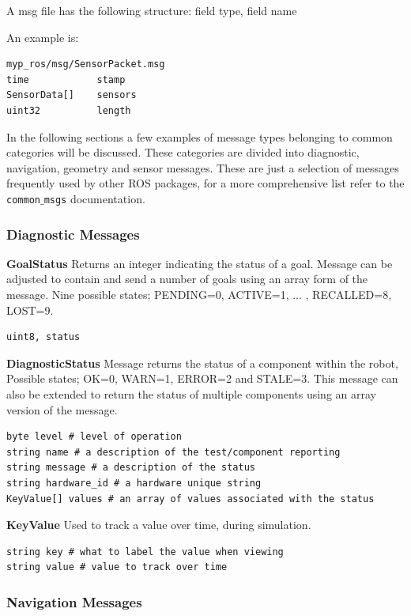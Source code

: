 \documentclass[twoside]{article}
\begin{document}
A msg file has the following structure: field type, field name

An example is:
\begin{verbatim}
myp_ros/msg/SensorPacket.msg 
time            stamp
SensorData[]    sensors
uint32          length
\end{verbatim}

In the following sections a few examples of message types belonging to common categories will be discussed. These categories are divided into diagnostic, navigation, geometry and sensor messages. These are just a selection of messages frequently used by other ROS packages, for a more comprehensive list refer to the \texttt{common$\_$msgs} documentation.


\subsubsection{Diagnostic Messages} 
\textbf{GoalStatus}\newline
Returns an integer indicating the status of a goal. Message can be adjusted to contain and send a number of goals using an array form of the message. Nine possible states; PENDING=0, ACTIVE=1, ... , RECALLED=8, LOST=9.
\begin{verbatim}
uint8, status  
\end{verbatim}

\textbf{DiagnosticStatus} \newline
Message returns the status of a component within the robot, Possible states; OK=0, WARN=1, ERROR=2 and STALE=3. This message can also be extended to return the status of multiple components using an array version of the message.
\begin{verbatim}
byte level # level of operation 
string name # a description of the test/component reporting
string message # a description of the status
string hardware_id # a hardware unique string
KeyValue[] values # an array of values associated with the status
\end{verbatim} 

\textbf{KeyValue} \newline
Used to track a value over time, during simulation. 
\begin{verbatim}
string key # what to label the value when viewing
string value # value to track over time
\end{verbatim}

\subsubsection{Navigation Messages}
\end{document}
